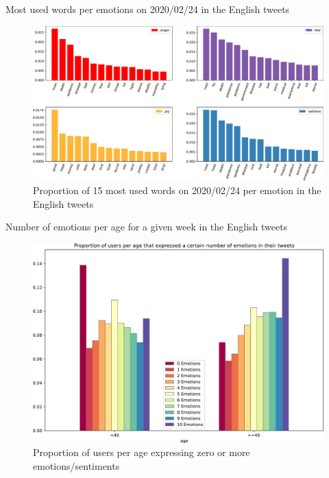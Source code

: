 \documentclass[8pt]{beamer}  %
\begin{document}
\begin{frame}{Most used words per emotions on 2020/02/24 in the English tweets}

    \begin{figure}[H]
	    \centering
    	\includegraphics[scale=.25]{assets/img/en_most_used_words_4_emotions_2020_02_24_subplot.svg.pdf}
    	\caption{Proportion of 15 most used words on 2020/02/24 per emotion in the English tweets}
    	\label{fig:en-most-used-word-subplot-2020-02-24}
    \end{figure}
    
\end{frame}

\begin{frame}{Number of emotions per age for a given week in the English tweets}

    \begin{figure}[H]
	    \centering
    	\includegraphics[scale=.25]{assets/img/en_number_of_emotions_per_age.svg.pdf}
    	\caption{Proportion of users per age expressing zero or more emotions/sentiments}
    	\label{fig:en-4-emotions-per-age-per-number}
    \end{figure}
    
\end{frame}
\end{document}

